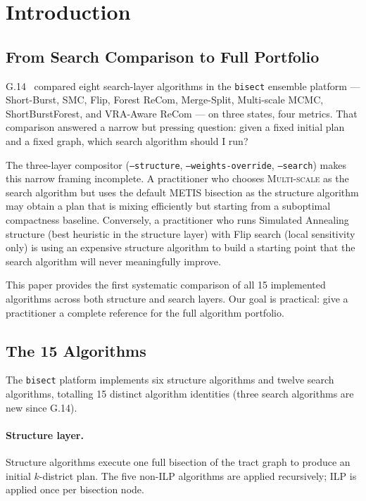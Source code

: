 \section{Introduction}
\label{sec:introduction}

\subsection{From Search Comparison to Full Portfolio}

G.14~\citep{dellaLibera2026g14} compared eight search-layer algorithms in the
\texttt{bisect} ensemble platform --- Short-Burst, SMC, Flip, Forest ReCom,
Merge-Split, Multi-scale MCMC, ShortBurstForest, and VRA-Aware ReCom --- on
three states, four metrics.
That comparison answered a narrow but pressing question: given a fixed initial
plan and a fixed graph, which search algorithm should I run?

The three-layer compositor (\texttt{--structure}, \texttt{--weights-override},
\texttt{--search}) makes this narrow framing incomplete.
A practitioner who chooses \textsc{Multi-scale} as the search algorithm but
uses the default METIS bisection as the structure algorithm may obtain a
plan that is mixing efficiently but starting from a suboptimal compactness
baseline.
Conversely, a practitioner who runs Simulated Annealing structure (best
heuristic \ec{} in the structure layer) with Flip search (local sensitivity
only) is using an expensive structure algorithm to build a starting point
that the search algorithm will never meaningfully improve.

This paper provides the first systematic comparison of all 15 implemented
algorithms across both structure and search layers.
Our goal is practical: give a practitioner a complete reference for the full
algorithm portfolio.

\subsection{The 15 Algorithms}

The \texttt{bisect} platform implements six structure algorithms and twelve
search algorithms, totalling 15 distinct algorithm identities (three search
algorithms are new since G.14).

\paragraph{Structure layer.}
Structure algorithms execute one full bisection of the tract graph to produce
an initial $k$-district plan.
The five non-ILP algorithms are applied recursively; ILP is applied once per
bisection node.

